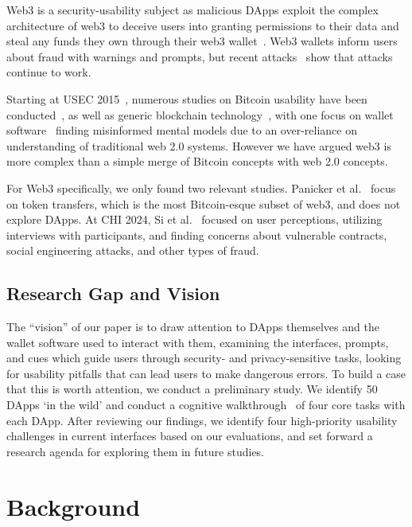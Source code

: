 \documentclass[conference]{IEEEtran}
\begin{document}
Web3 is a security-usability subject as malicious DApps exploit the complex architecture of web3 to deceive users into granting permissions to their data and steal any funds they own through their web3 wallet~\cite{si2024understanding,torres2023your}.
Web3 wallets inform users about fraud with warnings and prompts, but recent attacks~\cite{toulas2024lottiefiles,vismaya2024pepe,zmudzinski2024Eigenlayer} show that attacks continue to work.

Starting at USEC 2015~\cite{eskandari2018first}, numerous studies on Bitcoin usability have been conducted~\cite{gao2016of,krombholz2017the,mai2020user,sas2017design}, as well as generic blockchain technology~\cite{frohlich2022blockchain,jang2022userExperience,jang2020userPerspectives}, with one focus on wallet software~\cite{voskobojnikov2021u} finding misinformed mental models due to an over-reliance on understanding of traditional web 2.0 systems. However we have argued web3 is more complex than a simple merge of Bitcoin concepts with web 2.0 concepts.

For Web3 specifically, we only found two relevant studies. Panicker et al.~\cite{panicker2024end} focus on token transfers, which is the most Bitcoin-esque subset of web3, and does not explore DApps. At CHI 2024, Si et al.~\cite{si2024understanding} focused on user perceptions, utilizing interviews with participants, and finding concerns about vulnerable contracts, social engineering attacks, and other types of fraud.

\subsection{Research Gap and Vision}

The ``vision'' of our paper is to draw attention to DApps themselves and the wallet software used to interact with them, examining the interfaces, prompts, and cues which guide users through security- and privacy-sensitive tasks, looking for usability pitfalls that can lead users to make dangerous errors. To build a case that this is worth attention, we conduct a preliminary study. We identify 50 DApps `in the wild' and conduct a cognitive walkthrough~\cite{wharton1994cognitive} of four core tasks with each DApp. After reviewing our findings, we identify four high-priority usability challenges in current interfaces based on our evaluations, and set forward a research agenda for exploring them in future studies. 

\section{Background}
\end{document}
